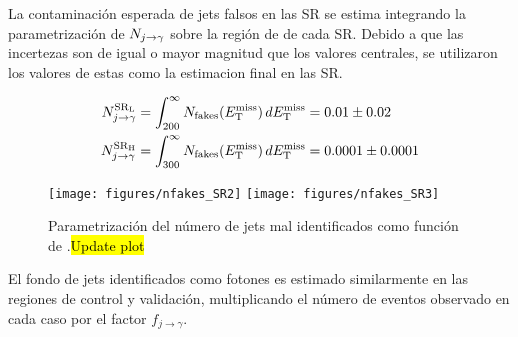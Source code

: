 La contaminación esperada de jets falsos en las SR se estima integrando la
parametrización de $N_{j\rightarrow\gamma}$ sobre la región de {\met} de cada SR.
Debido a que las incertezas son de igual o mayor magnitud que los valores centrales,
se utilizaron los valores de estas como la estimacion final en las SR.

\begin{align}
  N_{j\rightarrow\gamma}^\text{\ensuremath{\mathrm{SR}_\mathrm{L}}} &= \int_{200}^{\infty} N_\text{fakes}(E_{\mathrm{T}}^{\mathrm{miss}}) \, dE_{\mathrm{T}}^{\mathrm{miss}} = 0.01 \pm 0.02 \\
  N_{j\rightarrow\gamma}^\text{\ensuremath{\mathrm{SR}_\mathrm{H}}} &= \int_{300}^{\infty} N_\text{fakes}(E_{\mathrm{T}}^{\mathrm{miss}}) \, dE_{\mathrm{T}}^{\mathrm{miss}} = 0.0001 \pm 0.0001
\end{align}


\begin{figure}[!htbp]
  \centering
  \texttt{[image: figures/nfakes\_SR2]}  \hfill
  \texttt{[image: figures/nfakes\_SR3]}
  \caption{Parametrización del número de jets mal identificados como
    función de {\met}.\hl{Update plot}}
  \label{fig:jetfake_nfakes_met}
\end{figure}

El fondo de jets identificados como fotones es estimado similarmente en las
regiones de control y validación,
multiplicando el número de eventos observado en cada caso por el factor
$f_{j\to\gamma}$.









